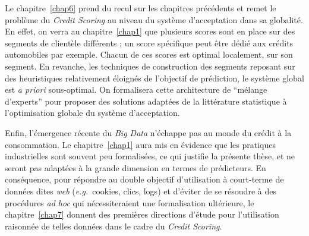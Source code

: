 Le chapitre~\ref{chap6} prend du recul sur les chapitres précédents et remet le problème du \textit{Credit Scoring} au niveau du système d'acceptation dans sa globalité. En effet, on verra au chapitre~\ref{chap1} que plusieurs scores sont en place sur des segments de clientèle différents ; un score spécifique peut être dédié aux crédits automobiles par exemple. Chacun de ces scores est optimal localement, sur son segment. En revanche, les techniques de construction des segments reposant sur des heuristiques relativement éloignés de l'objectif de prédiction, le système global est \textit{a priori} sous-optimal. On formalisera cette architecture de ``mélange d'experts'' pour proposer des solutions adaptées de la littérature statistique à l'optimisation globale du système d'acceptation.

Enfin, l'émergence récente du \textit{Big Data} n'échappe pas au monde du crédit à la consommation. Le chapitre~\ref{chap1} aura mis en évidence que les pratiques industrielles sont souvent peu formalisées, ce qui justifie la présente thèse, et ne seront pas adaptées à la grande dimension en termes de prédicteurs. En conséquence, pour répondre au double objectif d'utilisation à court-terme de données dites \textit{web} (\textit{e.g.}\ cookies, clics, logs) et d'éviter de se résoudre à des procédures \textit{ad hoc} qui nécessiteraient une formalisation ultérieure, le chapitre~\ref{chap7} donnent des premières directions d'étude pour l'utilisation raisonnée de telles données dans le cadre du \textit{Credit Scoring}.

\printbibliography[heading=subbibliography, title=Références de l'introduction]